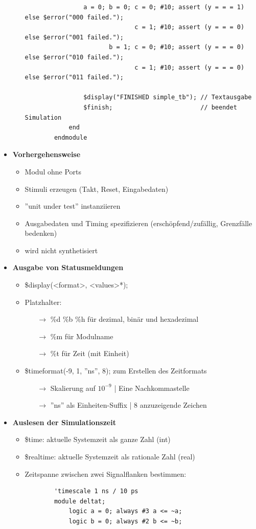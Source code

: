 \documentclass[11pt,a4paper]{article}
\begin{document}
\begin{itemize}
\begin{itemize}
\begin{lstlisting}
				a = 0; b = 0; c = 0; #10; assert (y = = = 1) else $error("000 failed.");
							  c = 1; #10; assert (y = = = 0) else $error("001 failed.");
					   b = 1; c = 0; #10; assert (y = = = 0) else $error("010 failed.");
					   	      c = 1; #10; assert (y = = = 0) else $error("011 failed.");
					   	      
				$display("FINISHED simple_tb"); // Textausgabe
				$finish; 						// beendet Simulation
			end
		endmodule
		\end{lstlisting}
	\end{itemize}
	
\item \textbf{Vorhergehensweise}
	\begin{itemize}
	\item Modul ohne Ports
	\item Stimuli erzeugen (Takt, Reset, Eingabedaten)
	\item ''unit under test'' instanziieren
	\item Ausgabedaten und Timing spezifizieren (erschöpfend/zufällig, Grenzfälle bedenken)
	\item wird nicht synthetisiert
	\end{itemize}

\item \textbf{Ausgabe von Statusmeldungen}
	\begin{itemize}
	\item \$display(<format>, <values>*);
	\item Platzhalter:
		\begin{itemize}
		\item[$\rightarrow$] \%d \%b \%h für dezimal, binär und hexadezimal
		\item[$\rightarrow$] \%m für Modulname
		\item[$\rightarrow$] \%t für Zeit (mit Einheit)
		\end{itemize}
	\item \$timeformat(-9, 1, ''ns'', 8); zum Erstellen des Zeitformats
		\begin{itemize}
		\item[$\rightarrow$] Skalierung auf $10^{-9}$ | Eine Nachkommastelle
		\item[$\rightarrow$] ''ns'' als Einheiten-Suffix | 8 anzuzeigende Zeichen
		\end{itemize}
	\end{itemize}

\item \textbf{Auslesen der Simulationszeit}
	\begin{itemize}
	\item \$time: aktuelle Systemzeit als ganze Zahl (int)
	\item \$realtime: aktuelle Systemzeit als rationale Zahl (real)
	\item Zeitspanne zwischen zwei Signalflanken bestimmen:
	\item[]
		\begin{lstlisting}
		'timescale 1 ns / 10 ps
		module deltat;
			logic a = 0; always #3 a <= ~a;
			logic b = 0; always #2 b <= ~b;
			

\end{lstlisting}
\end{itemize}
\end{itemize}
\end{document}

